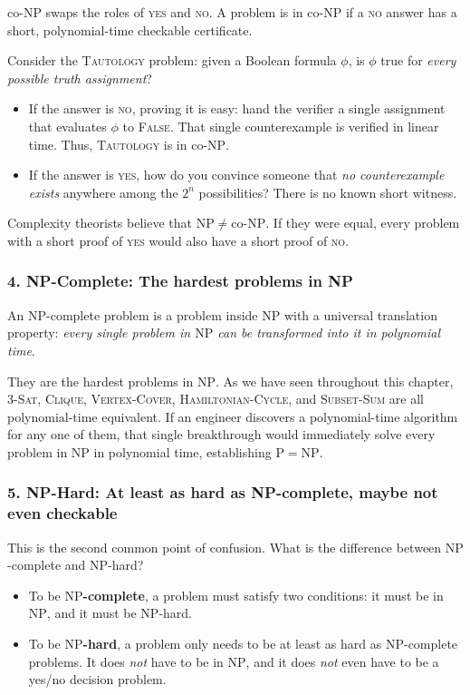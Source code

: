 $\mathrm{co\text{-}NP}$ swaps the roles of \textsc{yes} and \textsc{no}. A problem is in $\mathrm{co\text{-}NP}$ if a \textsc{no} answer has a short, polynomial-time checkable certificate.

Consider the \textsc{Tautology} problem: given a Boolean formula $\phi$, is $\phi$ true for \emph{every possible truth assignment}?
\begin{itemize}
  \item If the answer is \textsc{no}, proving it is easy: hand the verifier a single assignment that evaluates $\phi$ to \textsc{False}. That single counterexample is verified in linear time. Thus, \textsc{Tautology} is in $\mathrm{co\text{-}NP}$.
  \item If the answer is \textsc{yes}, how do you convince someone that \emph{no counterexample exists} anywhere among the $2^n$ possibilities? There is no known short witness.
\end{itemize}
Complexity theorists believe that $\mathrm{NP} \neq \mathrm{co\text{-}NP}$. If they were equal, every problem with a short proof of \textsc{yes} would also have a short proof of \textsc{no}.

\subsubsection{4. NP-Complete: The hardest problems in NP}
An $\mathrm{NP}$-complete problem is a problem inside $\mathrm{NP}$ with a universal translation property: \emph{every single problem in $\mathrm{NP}$ can be transformed into it in polynomial time}.

They are the hardest problems in $\mathrm{NP}$. As we have seen throughout this chapter, \textsc{3-Sat}, \textsc{Clique}, \textsc{Vertex-Cover}, \textsc{Hamiltonian-Cycle}, and \textsc{Subset-Sum} are all polynomial-time equivalent. If an engineer discovers a polynomial-time algorithm for any one of them, that single breakthrough would immediately solve every problem in $\mathrm{NP}$ in polynomial time, establishing $\mathrm{P} = \mathrm{NP}$.

\subsubsection{5. NP-Hard: At least as hard as NP-complete, maybe not even checkable}
This is the second common point of confusion. What is the difference between $\mathrm{NP}$-complete and $\mathrm{NP}$-hard?
\begin{itemize}
  \item To be \textbf{$\mathrm{NP}$-complete}, a problem must satisfy two conditions: it must be in $\mathrm{NP}$, and it must be $\mathrm{NP}$-hard.
  \item To be \textbf{$\mathrm{NP}$-hard}, a problem only needs to be at least as hard as $\mathrm{NP}$-complete problems. It does \emph{not} have to be in $\mathrm{NP}$, and it does \emph{not} even have to be a yes/no decision problem.
\end{itemize}

